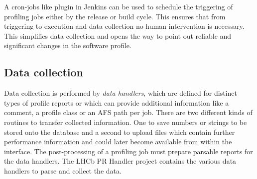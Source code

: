 \documentclass[a4paper]{jpconf}
\begin{document}
A cron-jobs like plugin in Jenkins can be used to schedule the triggering of profiling jobs either by the release or build cycle. This ensures that from triggering to execution and data collection no human intervention is necessary. This simplifies data collection and opens the way to point out reliable and significant changes in the software profile.

\subsection{Data collection}
\label{sec:data_collection}

Data collection is performed by \textit{data handlers}, which are defined for distinct types of profile reports or which can provide additional information like a comment, a profile class or an AFS path per job. There are two different kinds of routines to transfer collected information. One to save numbers or strings to be stored onto the database and a second to upload files which contain further performance information and could later become available from within the interface. The post-processing of a profiling job must prepare parsable reports for the data handlers. The LHCb PR Handler project contains the various data handlers to parse and collect the data.
\end{document}
